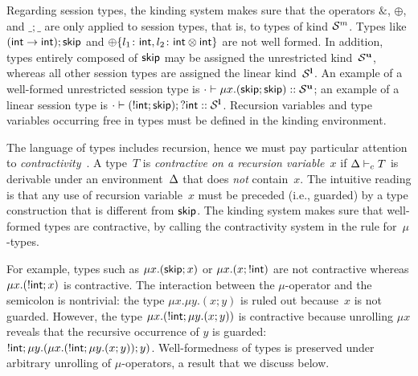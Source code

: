 Regarding session types, the kinding system makes sure that the
operators $\&$, $\oplus$, and $\_;\_$ are only applied to session types,
that is, to types of kind $\mathcal S^m$. Types like
$(\mathsf{int} \rightarrow \mathsf{int}); \mathsf{skip}$ and
$\oplus\{l_1\colon \mathsf{int}, l_2\colon \mathsf{int}\otimes \mathsf{int}\}$ are not well formed. In
addition, types entirely composed of $\mathsf{skip}$ may be assigned the
unrestricted kind~$\mathcal S^{\mathbf{u}}$, whereas all other session
types are assigned the linear kind~$\mathcal S^{\mathbf{l}}$. An example of a
well-formed unrestricted session type is
$\cdot \vdash \mu x.(\mathsf{skip};\mathsf{skip})::\mathcal S^{\mathbf{u}}$; an example
of a linear session type is
$\cdot \vdash (!\mathsf{int};\mathsf{skip});?\mathsf{int} :: \mathcal S^{\mathbf{l}}$.
%
Recursion variables and type variables occurring free in types must be
defined in the kinding environment.
%




The language of types includes recursion, hence we must pay particular
attention to
\emph{contractivity}~\cite{DBLP:journals/tcs/Courcelle83}.  A type~$T$
is \emph{contractive on a recursion variable~$x$} if $\Delta \vdash_{c}
T$ %
is derivable under an environment~$\Delta$
that does \emph{not} contain~$x$.
%
%
%
The intuitive reading is that any use of recursion
variable~$x$ must be preceded (i.e., guarded) by a type construction that is different from $\mathsf{skip}$.
%
The kinding system makes sure that well-formed types are contractive, by
calling the contractivity system in the rule for~$\mu$-types.

For example, types such as $\mu x. (\mathsf{skip}; x)$ or $\mu x.(x; !\mathsf{int})$
are not contractive whereas $\mu x.(!\mathsf{int}; x)$ is contractive.
%
The interaction between the $\mu$-operator and the semicolon is
nontrivial: the type $\mu x. \mu y. (x; y) $ is ruled out because~$x$
is not guarded. However, the type $\mu x. (!\mathsf{int}; \mu y. (x; y))$ is
contractive because unrolling $\mu x$ reveals that the recursive
occurrence of $y$ is guarded:
$!\mathsf{int}; \mu y. (\mu x. (!\mathsf{int}; \mu y. (x; y)); y)$. 
Well-formedness of types is preserved
under arbitrary unrolling of $\mu$-operators, a result that we discuss
below.

